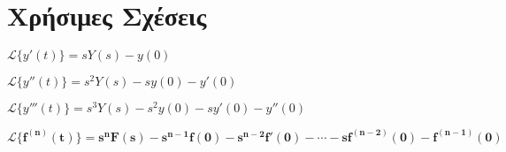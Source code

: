 \documentclass[a4paper,table]{report}
\begin{document}
\section*{Χρήσιμες Σχέσεις}
\centering
\begin{myitemize}
  \item $ \mathcal{L}\{y'(t)\} = sY(s) - y(0) $
  \item $ \mathcal{L}\{y''(t)\} = s^{2}Y(s) - sy(0) - y'(0) $
  \item $ \mathcal{L}\{y'''(t)\} = s^{3}Y(s) - s^{2}y(0) - sy'(0) - y''(0) $
  \item $ \bm{\mathcal{L}\{f^{(n)}(t)\} = s^{n} F(s) - s^{n-1}f(0) - s^{n-2}f'(0) - 
    \cdots - sf^{(n-2)}(0)- f^{(n-1)}(0)} $
\end{myitemize}
\end{document}
